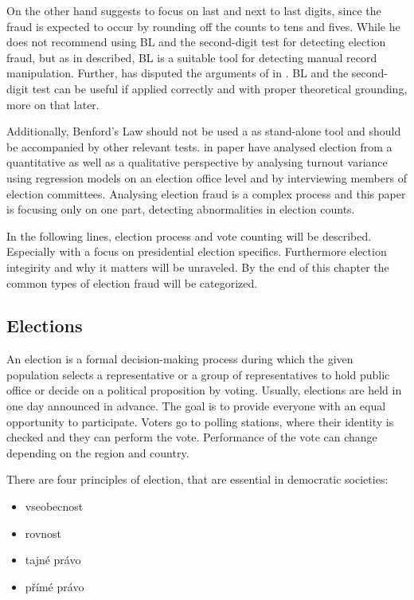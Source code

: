On the other hand \citeauthor{Deckert2011} suggests to focus on last and next to last digits, since the fraud is expected to occur by rounding off the counts to tens and fives. While he does not recommend using BL and the second-digit test for detecting election fraud, but as \citeauthor{Beber2012} in \citeyear{Beber2012} described, BL is a suitable tool for detecting manual record manipulation. Further, \citeauthor{Mebane2011} has disputed the arguments of \citeauthor{Deckert2011} in \citeyear{Mebane2011}. BL and the second-digit test can be useful if applied correctly and with proper theoretical grounding, more on that later.

Additionally, Benford's Law should not be used a as stand-alone tool and should be accompanied by other relevant tests. \citeauthor{Lebeda2021} in paper  have analysed election from a quantitative as well as a qualitative perspective by analysing turnout variance using regression models on an election office level and by interviewing members of election committees. Analysing election fraud is a complex process and this paper is focusing only on one part, detecting abnormalities in election counts. 


In the following lines, election process and vote counting will be described. Especially with a focus on presidential election specifics. Furthermore election integirity and why it matters will be unraveled. By the end of this chapter the common types of election fraud will be categorized.  



\subsection{Elections} 

An election is a formal decision-making process during which the given population selects a representative or a group of representatives to hold public office or decide on a political proposition by voting. 
Usually, elections are held in one day announced in advance. The goal is to provide everyone with an equal opportunity to participate. Voters go to polling stations, where their identity is checked and they can perform the vote. Performance of the vote can change depending on the region and country. \cite{election} 


There are four principles of election, that are essential in democratic societies: 

\begin{koment}
    \begin{itemize}
        \item vseobecnost 
        \item rovnost
        \item tajné právo 
        \item přímé právo 
    \end{itemize}
\end{koment}

